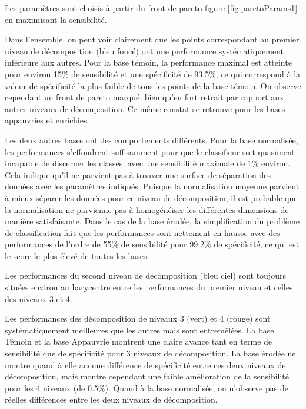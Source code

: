 Les paramètres sont choisis à partir du front de pareto figure \ref{fig:paretoParams1} en maximisant la sensibilité.

Dans l'ensemble, on peut voir clairement que les points correspondant au premier niveau de décomposition (bleu foncé) ont une performance systématiquement inférieure aux autres. Pour la base témoin, la performance maximal est atteinte pour environ 15\% de sensibilité et une spécificité de 93.5\%, ce qui correspond à la valeur de spécificité la plus faible de tous les points de la base témoin. On observe cependant un front de pareto marqué, bien qu'en fort retrait par rapport aux autres niveaux de décomposition. Ce même constat se retrouve pour les bases appauvries et enrichies.

Les deux autres bases ont des comportements différents. Pour la base normalisée, les performances s'effondrent suffisamment pour que le classifieur soit quasiment incapable de discerner les classes, avec une sensibilité maximale de 1\% environ. Cela indique qu'il ne parvient pas à trouver une surface de séparation des données avec les paramètres indiqués. Puisque la normalisation moyenne parvient à mieux séparer les données pour ce niveau de décomposition, il est probable que la normalisation ne parvienne pas à homogénéiser les différentes dimensions de manière satisfaisante. Dans le cas de la base érodée, la simplification du problème de classification fait que les performances sont nettement en hausse avec des performances de l'ordre de 55\% de sensibilité pour 99.2\% de spécificité, ce qui est le score le plus élevé de toutes les bases.

Les performances du second niveau de décomposition (bleu ciel) sont toujours situées environ au barycentre entre les performances du premier niveau et celles des niveaux 3 et 4.

Les performances des décomposition de niveaux 3 (vert) et 4 (rouge) sont systématiquement meilleures que les autres mais sont entremêlées. La base Témoin et la base Appauvrie montrent une claire avance tant en terme de sensibilité que de spécificité pour 3 niveaux de décomposition. La base érodée ne montre quand à elle aucune différence de spécificité entre ces deux niveaux de décomposition, mais montre cependant une faible amélioration de la sensibilité pour les 4 niveaux (de 0.5\%). Quand à la base normalisée, on n'observe pas de réelles différences entre les deux niveaux de décomposition.

